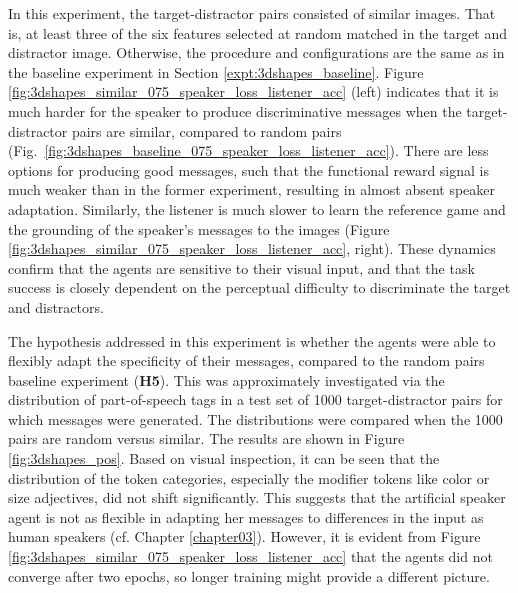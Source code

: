 In this experiment, the target-distractor pairs consisted of similar images. That is, at least three of the six features selected at random matched in the target and distractor image. Otherwise, the procedure and configurations are the same as in the baseline experiment in Section \ref{expt:3dshapes_baseline}. 
Figure \ref{fig:3dshapes_similar_075_speaker_loss_listener_acc} (left) indicates that it is much harder for the speaker to produce discriminative messages when the target-distractor pairs are similar, compared to random pairs (Fig.~\ref{fig:3dshapes_baseline_075_speaker_loss_listener_acc}). There are less options for producing good messages, such that the functional reward signal is much weaker than in the former experiment, resulting in almost absent speaker adaptation. Similarly, the listener is much slower to learn the reference game and the grounding of the speaker's messages to the images (Figure \ref{fig:3dshapes_similar_075_speaker_loss_listener_acc}, right). These dynamics confirm that the agents are sensitive to their visual input, and that the task success is closely dependent on the perceptual difficulty to discriminate the target and distractors.

The hypothesis addressed in this experiment is whether the agents were able to flexibly adapt the specificity of their messages, compared to the random pairs baseline experiment (\textbf{H5}). This was approximately investigated via the distribution of part-of-speech tags in a test set of 1000 target-distractor pairs for which messages were generated. The distributions were compared when the 1000 pairs are random versus similar. The results are shown in Figure \ref{fig:3dshapes_pos}. Based on visual inspection, it can be seen that the distribution of the token categories, especially the modifier tokens like color or size adjectives, did not shift significantly. This suggests that the artificial speaker agent is not as flexible in adapting her messages to differences in the input as human speakers (cf. Chapter \ref{chapter03}). However, it is evident from Figure \ref{fig:3dshapes_similar_075_speaker_loss_listener_acc} that the agents did not converge after two epochs, so longer training might provide a different picture. 

